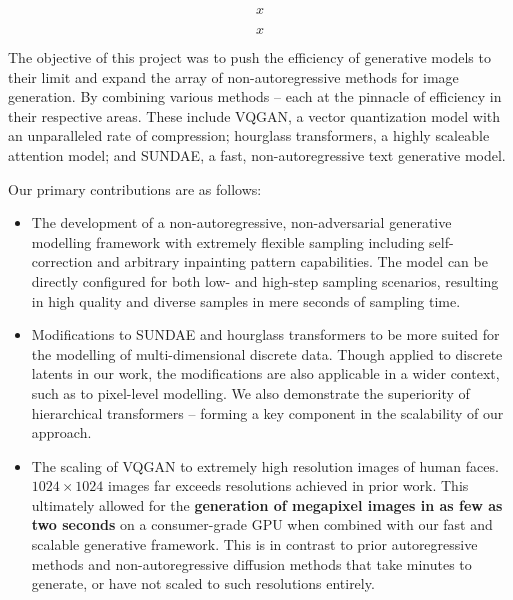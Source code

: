 \documentclass[14pt,margin=0.5in,innermargin=0in,blockverticalspace=-0.1in,colspace=-1.0cm]{tikzposter}
\begin{document}
\begin{columns}
{\begin{tcolorbox}[boxsep=0pt,top=0cm,adjusted title={\Large Proposed Method},colbacktitle=colorOne]
        \begin{minipage}{0.49\linewidth}
        \begin{equation}
            x
        \end{equation}
        \end{minipage}
        \begin{minipage}{0.49\linewidth}
        \begin{equation}
            x
        \end{equation}
        \end{minipage}
        \vspace{1cm}
        
        The objective of this project was to push the efficiency of generative
        models to their limit and expand the array of non-autoregressive methods
        for image generation. By combining various methods -- each at the
        pinnacle of efficiency in their respective areas. These include VQGAN, a
        vector quantization model with an unparalleled rate of compression;
        hourglass transformers, a highly scaleable attention model; and SUNDAE,
        a fast, non-autoregressive text generative model.

        Our primary contributions are as follows:
        \begin{itemize}
            \item
                The development of a non-autoregressive, non-adversarial
                generative modelling framework with extremely flexible sampling
                including self-correction and arbitrary inpainting pattern
                capabilities. The model can be directly configured for both low-
                and high-step sampling scenarios, resulting in high quality and
                diverse samples in mere seconds of sampling time.

            \item
                Modifications to SUNDAE and hourglass transformers to be more
                suited for the modelling of multi-dimensional discrete data. Though
                applied to discrete latents in our work, the modifications are
                also applicable in a wider context, such as to pixel-level
                modelling. We also demonstrate the superiority of hierarchical
                transformers -- forming a key component in the scalability of
                our approach. 
            \item
                The scaling of VQGAN to extremely high resolution images of
                human faces. $1024 \times 1024$ images far exceeds resolutions
                achieved in prior work. This ultimately allowed for the
                \textbf{generation of megapixel images in as few as two seconds}
                on a consumer-grade GPU when combined with our fast and scalable
                generative framework. This is in contrast to prior
                autoregressive methods and non-autoregressive diffusion methods
                that take minutes to generate, or have not scaled to such
                resolutions entirely.


\end{itemize}
\end{tcolorbox}}
\end{columns}
\end{document}
